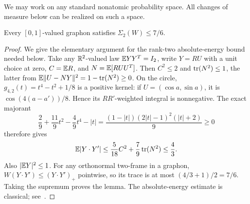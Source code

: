 We may work on any standard nonatomic probability space. All changes of
measure below can be realized on such a space.
\begin{lemma}\label{ranktwo}
Every $[0,1]$-valued graphon satisfies $\Sigma_2(W)\le7/6$.
\end{lemma}
\begin{proof}
We give the elementary argument for the rank-two absolute-energy
bound needed below.
Take any $\mathbb R^2$-valued law $\mathbb E YY^T=I_2$, write $Y=RU$ with a unit
choice at zero, $C=\mathbb E R$, and $N=\mathbb E[R UU^T]$.
Then $C^2\le2$ and
$\operatorname{tr}(N^2)\le1$, the latter from
$\mathbb E\|U-NY\|^2=1-\operatorname{tr}(N^2)\ge0$.
On the circle,
$g_{4,2}(t)=t^4-t^2+1/8$ is a positive kernel: if
$U=(\cos a,\sin a)$, it is $\cos(4(a-a'))/8$.
Hence its $RR'$-weighted integral is nonnegative.
The exact majorant
\[
 \frac29+\frac{11}{9}t^2-\frac49t^4-|t|
     =\frac{(1-|t|)(2|t|-1)^2(|t|+2)}9\ge0
\]
therefore gives
\[
 \mathbb E|Y\cdot Y'|\le\frac5{18}C^2+\frac79\operatorname{tr}(N^2)\le\frac43.
\]
Also $|\mathbb E Y|^2\le1$. For any orthonormal two-frame in a graphon,
$W(Y\cdot Y')\le(Y\cdot Y')_+$ pointwise, so its trace is at most
$(4/3+1)/2=7/6$. Taking the supremum proves the lemma.
The absolute-energy estimate is classical; see~\cite[Theorems 2 and 4]{Glazyrin}.
\end{proof}


